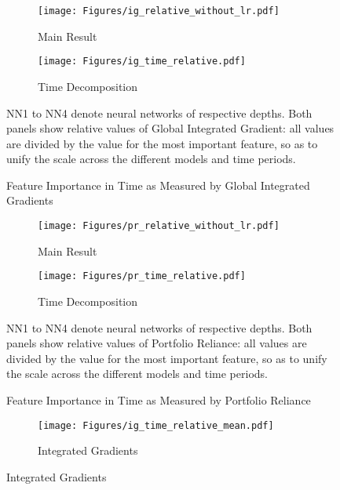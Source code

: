 {		\begin{figure}	
			\centering		
			\begin{subfigure}[t]{\textwidth}
				\texttt{[image: Figures/ig\_relative\_without\_lr.pdf]}
				\caption{Main Result}
				\label{fig:ig_time_main}
			\end{subfigure}
			
			\begin{subfigure}[t]{\textwidth}
				\centering
				\texttt{[image: Figures/ig\_time\_relative.pdf]}
				\caption{Time Decomposition}
				\label{fig:ig_time_relative}
			\end{subfigure}
			\caption{Feature Importance in Time as Measured by Global Integrated Gradients}
			\label{fig:ig_time}
			\medskip
			\small
			NN1 to NN4 denote neural networks of respective depths. Both panels show relative values of Global Integrated Gradient: all values are divided by the value for the most important feature, so as to unify the scale across the different models and time periods. 
		\end{figure}
	
		\begin{figure}	
			\centering		
			\begin{subfigure}[t]{\textwidth}
				\texttt{[image: Figures/pr\_relative\_without\_lr.pdf]}
				\caption{Main Result}
				\label{fig:pr_time_main}
			\end{subfigure}
			
			\begin{subfigure}[t]{\textwidth}
				\centering
				\texttt{[image: Figures/pr\_time\_relative.pdf]}
				\caption{Time Decomposition}
				\label{fig:pr_time_relative}
			\end{subfigure}
			\caption{Feature Importance in Time as Measured by Portfolio Reliance}
			\label{fig:pr_time}
			\medskip
			\small
			NN1 to NN4 denote neural networks of respective depths. Both panels show relative values of Portfolio Reliance: all values are divided by the value for the most important feature, so as to unify the scale across the different models and time periods. 
		\end{figure}
	
		\begin{figure}	
			\centering		
			\begin{subfigure}[t]{\textwidth}
				\texttt{[image: Figures/ig\_time\_relative\_mean.pdf]}
				\caption{Integrated Gradients}
				\label{fig:ig_time_mean}
			\end{subfigure}
			

\end{figure}}
